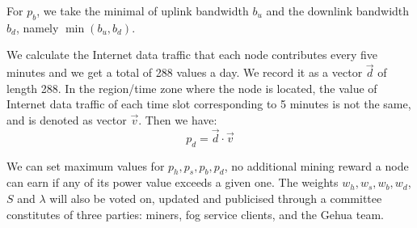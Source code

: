 For $p_b$, we take the minimal of uplink bandwidth $b_u$ and the downlink bandwidth $b_d$, namely $\min(b_u, b_d)$. 

We calculate the Internet data traffic that each node contributes every five minutes and we get a total of 288 values a day. We record it as a vector $\vec{d}$ of length 288. In the region/time zone where the node is located, the value of Internet data traffic of each time slot corresponding to 5 minutes is not the same, and is denoted as vector $\vec{v}$. Then we have: 
\begin{equation}
	p_d = \vec{d} \cdot \vec{v}
\end{equation}

We can set maximum values for $p_h, p_s, p_b, p_d$, no additional mining reward a node can earn if any of its power value exceeds a given one. The weights $w_h, w_s, w_b, w_d$, $S$ and $\lambda$ will also be voted on, updated and publicised through a committee constitutes of three parties: miners, fog service clients, and the Gehua team. 